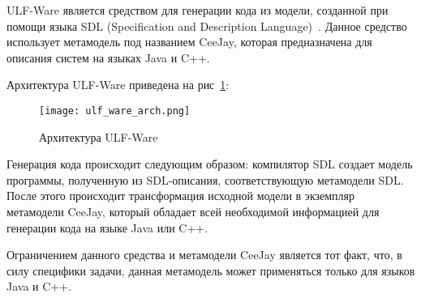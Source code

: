 
ULF-Ware является средством для генерации кода из модели, созданной при помощи
языка SDL (Specification and Description Language)~\cite{metamodeling}. Данное
средство использует метамодель под названием CeeJay, которая предназначена для
описания систем на языках Java и C++.

Архитектура ULF-Ware приведена на рис~\ref{fig:ulf_ware_arch}:

\newpage

\begin{figure}[h!]
    \begin{center}
        \texttt{[image: ulf\_ware\_arch.png]}
    \end{center}
    \caption{Архитектура ULF-Ware}
    \label{fig:ulf_ware_arch}
\end{figure}

Генерация кода происходит следующим образом: компилятор SDL создает модель
программы, полученную из SDL-описания, соответствующую метамодели SDL. После
этого происходит трансформация исходной модели в экземпляр метамодели CeeJay,
который обладает всей необходимой информацией для генерации кода на языке Java
или C++.

Ограничением данного средства и метамодели CeeJay является тот факт, что, в силу
специфики задачи, данная метамодель может применяться только для языков Java и
C++.
